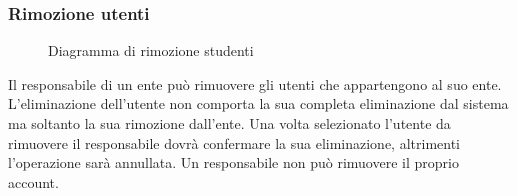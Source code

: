 \documentclass[a4paper, titlepage]{article}
\begin{document}
\subsubsection{Rimozione utenti}
\begin{figure}[H]
	\centering
	\noindent{}
	\caption{Diagramma di rimozione studenti}
\end{figure}
Il responsabile di un ente può rimuovere gli utenti che appartengono al suo ente. 
L’eliminazione dell’utente non comporta la sua completa eliminazione dal sistema ma soltanto la sua rimozione dall’ente. Una volta selezionato l’utente da rimuovere il responsabile dovrà confermare la sua eliminazione, altrimenti l’operazione sarà annullata. Un responsabile non può rimuovere il proprio account.

\newpage
\end{document}
